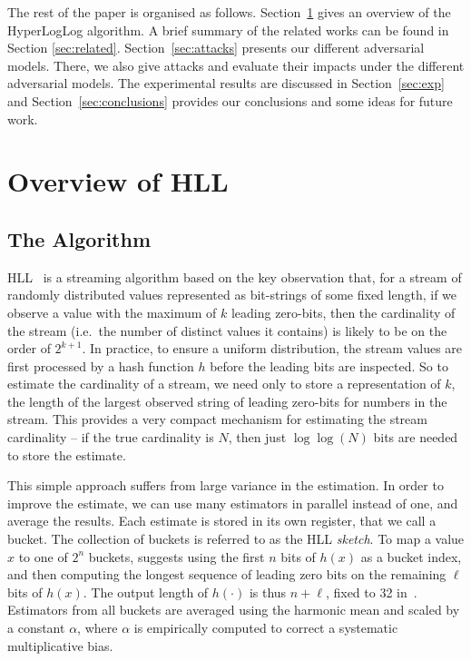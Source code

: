 \documentclass[11pt]{article}
\begin{document}
The rest of the paper is organised as follows. Section~\ref{sec:overview} gives an overview of the HyperLogLog algorithm. A brief summary of the related works can be found in Section \ref{sec:related}. Section~\ref{sec:attacks} presents our different adversarial models. There, we also give attacks and evaluate their impacts under the different adversarial models. The experimental results are discussed in Section~\ref{sec:exp} and Section~\ref{sec:conclusions} provides our conclusions and some ideas for future work.


\section{Overview of HLL}\label{sec:overview}
\subsection{The Algorithm}
HLL~\cite{hll} is a streaming algorithm based on the key observation that, for a stream of randomly distributed values represented as bit-strings of some fixed length, if we observe a value with the maximum of $k$ leading zero-bits, then the cardinality of the stream (i.e.\ the number of distinct values it contains) is likely to be on the order of $2^{k+1}$. In practice, to ensure a uniform distribution, the stream values are first processed by a hash function $h$ before the leading bits are inspected. So to estimate the cardinality of a stream, we need only to store a representation of $k$, the length of the largest observed string of leading zero-bits for numbers in the stream. This provides a very compact mechanism for estimating the stream cardinality -- if the true cardinality is $N$, then just $\log\log(N)$ bits are needed to store the estimate.

This simple approach suffers from large variance in the estimation. In order to improve the estimate, we can use many estimators in parallel instead of one, and average the results. Each estimate is stored in its own register, that we call a bucket. The collection of buckets is referred to as the HLL \emph{sketch}. To map a value $x$ to one of $2^n$ buckets, \cite{loglog} suggests using the first $n$ bits of $h(x)$ as a bucket index, and then computing the longest sequence of leading zero bits on the remaining $\ell$ bits of $h(x)$. The output length of $h(\cdot)$ is thus $n+\ell$, fixed to 32 in~\cite{hll}. Estimators from all buckets are averaged using the harmonic mean and scaled by a constant $\alpha$, where $\alpha$ is empirically computed to correct a systematic multiplicative bias.
\end{document}

